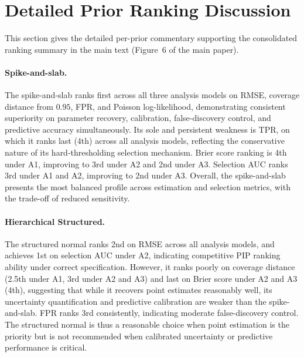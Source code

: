 \documentclass[12pt]{article}
\begin{document}
\section{Detailed Prior Ranking Discussion}
\label{sec:supp_ranking}

This section gives the detailed per-prior commentary supporting the consolidated
ranking summary in the main text (Figure~6 of the main paper).

\paragraph{Spike-and-slab.}
The spike-and-slab ranks first across all three analysis models on RMSE,
coverage distance from $0.95$, FPR, and Poisson log-likelihood, demonstrating
consistent superiority on parameter recovery, calibration, false-discovery
control, and predictive accuracy simultaneously. Its sole and persistent
weakness is TPR, on which it ranks last (4th) across all analysis models,
reflecting the conservative nature of its hard-thresholding selection
mechanism. Brier score ranking is 4th under A1, improving to 3rd under A2 and
2nd under A3. Selection AUC ranks 3rd under A1 and A2, improving to 2nd under
A3. Overall, the spike-and-slab presents the most balanced profile across
estimation and selection metrics, with the trade-off of reduced sensitivity.

\paragraph{Hierarchical Structured.}
The structured normal ranks 2nd on RMSE across all analysis models, and
achieves 1st on selection AUC under A2, indicating competitive PIP ranking
ability under correct specification. However, it ranks poorly on coverage
distance (2.5th under A1, 3rd under A2 and A3) and last on Brier score under
A2 and A3 (4th), suggesting that while it recovers point estimates reasonably
well, its uncertainty quantification and predictive calibration are weaker
than the spike-and-slab. FPR ranks 3rd consistently, indicating moderate
false-discovery control. The structured normal is thus a reasonable choice
when point estimation is the priority but is not recommended when calibrated
uncertainty or predictive performance is critical.
\end{document}
